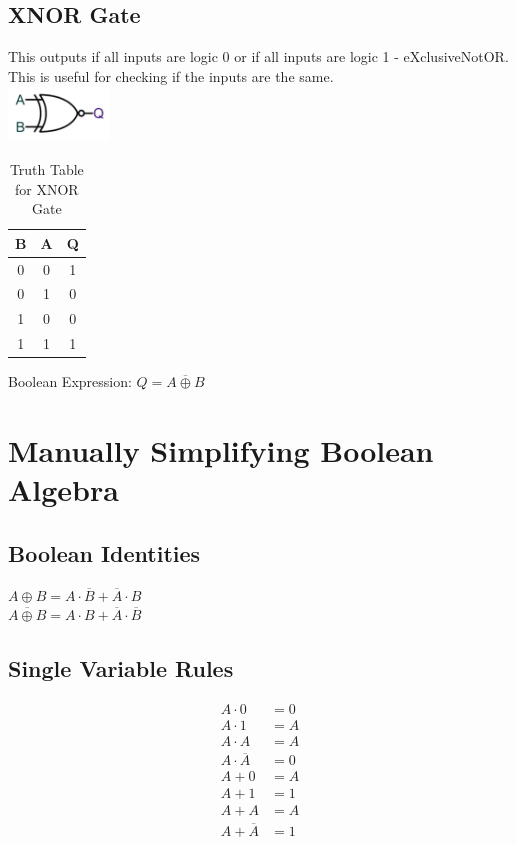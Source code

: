\documentclass[a4paper,11pt, twocolumn]{article}
\begin{document}
\subsection{XNOR Gate}
This outputs if all inputs are logic 0 or if all inputs are logic 1 - eXclusiveNotOR. This is useful for checking if the inputs are the same.\\
\includegraphics[width=0.2\textwidth]{xnorGate.PNG}\\
\begin{table}[H]
    \centering
    \begin{tabularx}{0.127\textwidth}{c|c|c}
    B & A & Q \\
    \hline
    0 & 0 & 1 \\
    0 & 1 & 0 \\
    1 & 0 & 0 \\
    1 & 1 & 1
    \end{tabularx}
    \caption{Truth Table for XNOR Gate}
\end{table}
Boolean Expression: $Q=\overline{A \oplus B}$

\section{Manually Simplifying Boolean Algebra}
\subsection{Boolean Identities}
$A\oplus B = A \cdot \overline{B} + \overline{A} \cdot B$\\
$\overline{A\oplus B} = A\cdot B + \overline{A} \cdot \overline{B}$
\subsection{Single Variable Rules}
\begin{align*}
    A \cdot 0 &= 0\\
    A \cdot 1 &= A\\
    A \cdot A &= A\\
    A \cdot \overline{A} &= 0\\
    A + 0 &= A\\
    A + 1 &= 1\\
    A + A &= A\\
    A + \overline{A} &= 1
\end{align*}
\end{document}
